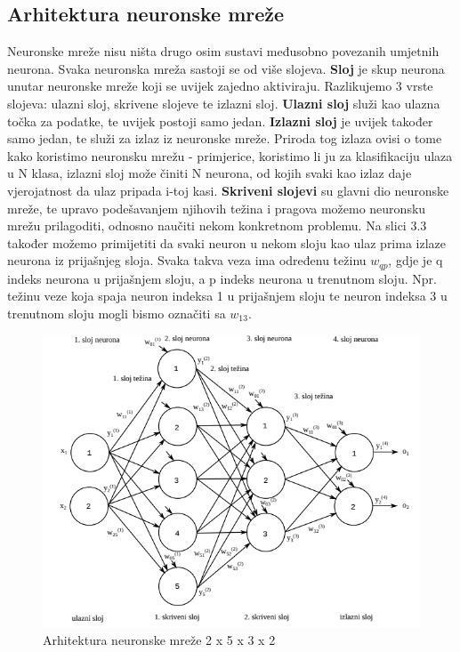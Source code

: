 \subsection{Arhitektura neuronske mreže}
Neuronske mreže nisu ništa drugo osim sustavi međusobno povezanih umjetnih neurona. Svaka neuronska mreža sastoji se od više slojeva. \textbf{Sloj} je skup neurona unutar neuronske mreže koji se uvijek zajedno aktiviraju. Razlikujemo 3 vrste slojeva: ulazni sloj, skrivene slojeve te izlazni sloj.
\textbf{Ulazni sloj} služi kao ulazna točka za podatke, te uvijek postoji samo jedan.
\textbf{Izlazni sloj} je uvijek također samo jedan, te služi za izlaz iz neuronske mreže. Priroda tog izlaza ovisi o tome kako koristimo neuronsku mrežu - primjerice, koristimo li ju za klasifikaciju ulaza u N klasa, izlazni sloj može činiti N neurona, od kojih svaki kao izlaz daje vjerojatnost da ulaz pripada i-toj kasi.
\textbf{Skriveni slojevi} su glavni dio neuronske mreže, te upravo podešavanjem njihovih težina i pragova možemo neuronsku mrežu prilagoditi, odnosno naučiti nekom konkretnom problemu.
Na slici 3.3 također možemo primijetiti da svaki neuron u nekom sloju kao ulaz prima izlaze neurona iz prijašnjeg sloja. Svaka takva veza ima određenu težinu $w_{qp}$, gdje je q indeks neurona u prijašnjem sloju, a p indeks neurona u trenutnom sloju. Npr. težinu veze koja spaja neuron indeksa 1 u prijašnjem sloju te neuron indeksa 3 u trenutnom sloju mogli bismo označiti sa $w_{13}$.

\begin{figure}[htb]
\centering
\includegraphics[width=14cm]{slike/neuronska_mreza_full.png}
\caption{Arhitektura neuronske mreže 2 x 5 x 3 x 2 \citep{umjetneNNJava}}
\label{fig:fer-logo}
\end{figure}
\textbf{}

